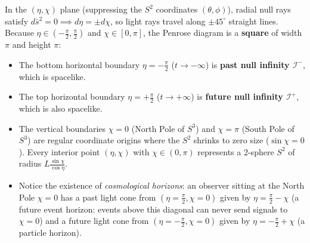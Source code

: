 \documentclass[12pt]{article}
\begin{document}
\begin{enumerate}[label=\alph*)]
In the $(\eta, \chi)$ plane (suppressing the $S^2$ coordinates $(\theta,\phi)$), radial null rays satisfy $d\bar{s}^2 = 0 \implies d\eta = \pm d\chi$, so light rays travel along $\pm 45^\circ$ straight lines. Because $\eta \in (-\frac{\pi}{2}, \frac{\pi}{2})$ and $\chi \in [0, \pi]$, the Penrose diagram is a \textbf{square} of width $\pi$ and height $\pi$:
\begin{itemize}
\item The bottom horizontal boundary $\eta = -\frac{\pi}{2}$ ($t \to -\infty$) is \textbf{past null infinity $\mathcal{I}^-$}, which is spacelike.
\item The top horizontal boundary $\eta = +\frac{\pi}{2}$ ($t \to +\infty$) is \textbf{future null infinity $\mathcal{I}^+$}, which is also spacelike.
\item The vertical boundaries $\chi = 0$ (North Pole of $S^3$) and $\chi = \pi$ (South Pole of $S^3$) are regular coordinate origins where the $S^2$ shrinks to zero size ($\sin\chi = 0$). Every interior point $(\eta, \chi)$ with $\chi \in (0,\pi)$ represents a 2-sphere $S^2$ of radius $L\frac{\sin\chi}{\cos\eta}$.
\item Notice the existence of \emph{cosmological horizons}: an observer sitting at the North Pole $\chi = 0$ has a past light cone from $(\eta = \frac{\pi}{2}, \chi = 0)$ given by $\eta = \frac{\pi}{2} - \chi$ (a future event horizon: events above this diagonal can never send signals to $\chi = 0$) and a future light cone from $(\eta = -\frac{\pi}{2}, \chi = 0)$ given by $\eta = -\frac{\pi}{2} + \chi$ (a particle horizon).
\end{itemize}

\begin{center}
\end{center}
\end{enumerate}
\end{document}
